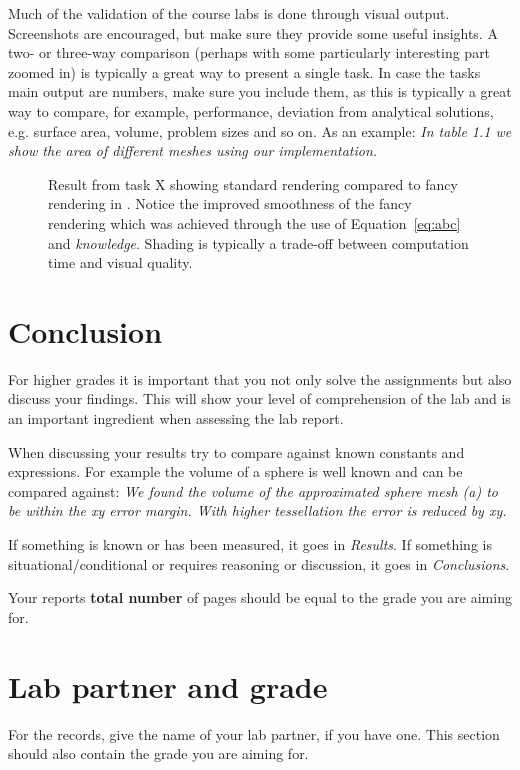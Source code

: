 \documentclass[twocolumn]{article}
\begin{document}
Much of the validation of the course labs is done through visual output. Screenshots are encouraged, but make sure they provide some useful insights. A two- or three-way comparison (perhaps with some particularly interesting part zoomed in) is typically a great way to present a single task. In case the tasks main output are numbers, make sure you include them, as this is typically a great way to compare, for example, performance, deviation from analytical solutions, e.g. surface area, volume, problem sizes and so on. As an example: \emph{In table 1.1 we show the area of different meshes using our implementation.}

\begin{figure}[t]
\centering
    \caption{Result from task X showing  standard rendering compared to fancy rendering in . Notice the improved smoothness of the fancy rendering which was achieved through the use of Equation~\ref{eq:abc} and \emph{knowledge}. Shading is typically a trade-off between computation time and visual quality.}
    \label{fig:demo}
\end{figure}


\section{Conclusion}
For higher grades it is important that you not only solve the assignments but also discuss your findings. This will show your level of comprehension of the lab and is an important ingredient when assessing the lab report.

When discussing your results try to compare against known constants and expressions. For example the volume of a sphere is well known and can be compared against: \emph{We found the volume of the approximated sphere mesh (a) to be within the xy error margin. With higher tessellation the error is reduced by xy.}

If something is known or has been measured, it goes in \emph{Results}. If something is situational/conditional or requires reasoning or discussion, it goes in \emph{Conclusions}.

Your reports \textbf{total number} of pages should be equal to the grade you are aiming for.

\section{Lab partner and grade}
For the records, give the name of your lab partner, if you have one. This section should also contain the grade you are aiming for.

\nocite{*}


\end{document}
